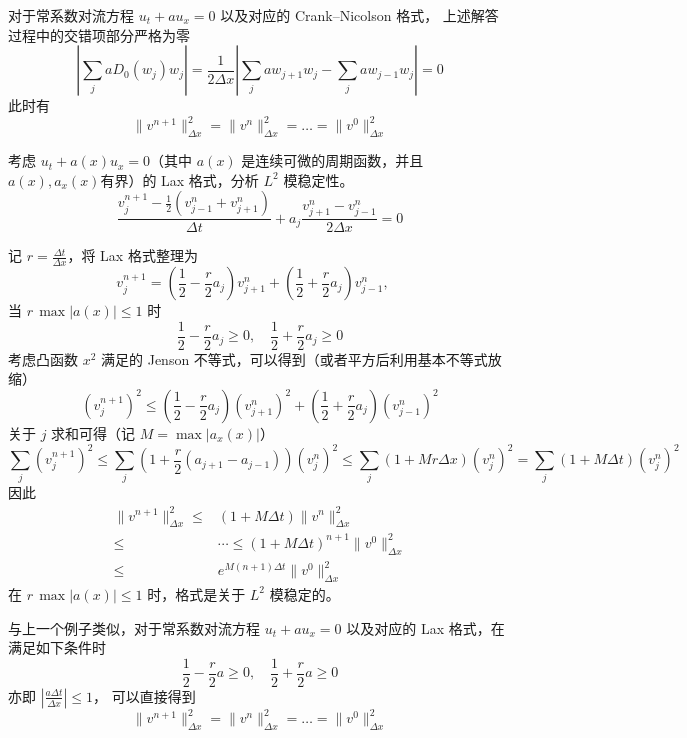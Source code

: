 \begin{remark}
    对于常系数对流方程 $u_t + a u_x = 0$ 以及对应的 Crank–Nicolson 格式，
    上述解答过程中的交错项部分严格为零
    \[
        \left| \sum_j a D_0(w_j) w_j \right|
        ={}
        \frac1{2\Delta x} \left|
        \sum_j a  w_{j+1} w_j - \sum_j a  w_{j-1} w_j
        \right| = 0
    \]
    此时有
    \[
        \|v^{n+1}\|_{\Delta x}^2 = \|v^{n}\|_{\Delta x}^2 = \dots = \|v^{0}\|_{\Delta x}^2
    \]
\end{remark}


\begin{example}
    考虑 $u_t+a(x)u_x=0$（其中 $a(x)$ 是连续可微的周期函数，并且$a(x),a_x(x)$有界）的 Lax 格式，分析 $L^2$ 模稳定性。
    \[
        \frac{v^{n+1}_j - \frac12(v_{j-1}^n + v_{j+1}^n)}{\Delta t} +  a_j\frac{v^n_{j+1} - v^n_{j-1}}{2\Delta x} = 0
    \]
\end{example}

\begin{solution*}
    记 $r = \frac{\Delta t}{\Delta x}$，将 Lax 格式整理为
    \[
        v^{n+1}_j=\left(\frac{1}{2}-\frac{r}{2}a_j\right)v^n_{j+1}+\left(\frac{1}{2}+\frac{r}{2}a_j\right)v^n_{j-1},\quad
    \]
    当 $r\,\max{|a(x)|}\le 1$ 时
    \[
        \frac{1}{2} - \frac{r}{2} a_j \ge 0, \quad \frac{1}{2} + \frac{r}{2} a_j \ge 0
    \]
    考虑凸函数 $x^2$ 满足的 Jenson 不等式，可以得到（或者平方后利用基本不等式放缩）
    \[
        (v^{n+1}_j)^2\le \left(\frac{1}{2}-\frac{r}{2}a_j\right)(v^n_{j+1})^2+\left(\frac{1}{2}+\frac{r}{2}a_j\right)(v^n_{j-1})^2
    \]
    关于 $j$ 求和可得（记 $M = \max|a_x(x)|$）
    \[
        \sum_{j}(v^{n+1}_j)^2\le \sum_{j}(1+\frac{r}{2}(a_{j+1}-a_{j-1}))(v^n_{j})^2
        \le \sum_{j}(1+ M r \Delta x)(v^n_{j})^2 = \sum_{j}(1 + M \Delta t)(v^n_{j})^2
    \]
    因此
    \begin{align*}
        \|v^{n+1}\|_{\Delta x}^2 \le{} & (1 + M \Delta t) \|v^{n}\|_{\Delta x}^2                  \\
        \le{}                          & \cdots \le (1 + M \Delta t)^{n+1} \|v^{0}\|_{\Delta x}^2 \\
        \le{}                          & e^{M (n+1)\Delta t} \|v^{0}\|_{\Delta x}^2
    \end{align*}
    在 $r\,\max{|a(x)|}\le 1$ 时，格式是关于 $L^2$ 模稳定的。
\end{solution*}

\begin{remark}
    与上一个例子类似，对于常系数对流方程 $u_t + a u_x = 0$ 以及对应的 Lax 格式，在满足如下条件时
    \[
        \frac{1}{2} - \frac{r}{2} a \ge 0,\quad \frac{1}{2} + \frac{r}{2} a \ge 0
    \]
    亦即 $\left|\frac{a \Delta t}{\Delta x}\right| \le 1$，
    可以直接得到
    \[
        \|v^{n+1}\|_{\Delta x}^2 = \|v^{n}\|_{\Delta x}^2 = \dots = \|v^{0}\|_{\Delta x}^2
    \]
\end{remark}

